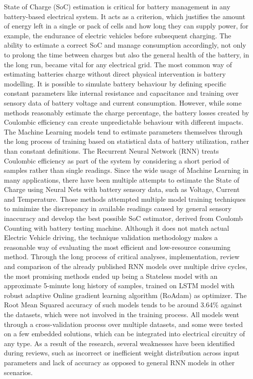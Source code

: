 %
%
{
State of Charge (SoC) estimation is critical for battery management in any battery-based electrical system.
It acts as a criterion, which justifies the amount of energy left in a single or pack of cells and how long they can supply power, for example, the endurance of electric vehicles before subsequent charging.
The ability to estimate a correct SoC and manage consumption accordingly, not only to prolong the time between charges but also the general health of the battery, in the long run, became vital for any electrical grid.
The most common way of estimating batteries charge without direct physical intervention is battery modelling.
It is possible to simulate battery behaviour by defining specific constant parameters like internal resistance and capacitance and training over sensory data of battery voltage and current consumption.
However, while some methods reasonably estimate the charge percentage, the battery losses created by Coulombic efficiency can create unpredictable behaviour with different impacts.
The Machine Learning models tend to estimate parameters themselves through the long process of training based on statistical data of battery utilization, rather than constant definitions.
The Recurrent Neural Network (RNN) treats Coulombic efficiency as part of the system by considering a short period of samples rather than single readings.
Since the wide usage of Machine Learning in many applications, there have been multiple attempts to estimate the State of Charge using Neural Nets with battery sensory data, such as Voltage, Current and Temperature.
Those methods attempted multiple model training techniques to minimize the discrepancy in available readings caused by general sensory inaccuracy and develop the best possible SoC estimator, derived from Coulomb Counting with battery testing machine.
Although it does not match actual Electric Vehicle driving, the technique validation methodology makes a reasonable way of evaluating the most efficient and low-resource consuming method.
Through the long process of critical analyses, implementation, review and comparison of the already published RNN models over multiple drive cycles, the most promising methods ended up being a Stateless model with an approximate 5-minute long history of samples, trained on LSTM model with robust adaptive Online gradient learning algorithm (RoAdam) as optimizer.
The Root Mean Squared accuracy of such models tends to be around 3.64\% against the datasets, which were not involved in the training process.
All models went through a cross-validation process over multiple datasets, and some were tested on a few embedded solutions, which can be integrated into electrical circuitry of any type.
As a result of the research, several weaknesses have been identified during reviews, such as incorrect or inefficient weight distribution across input parameters and lack of accuracy as opposed to general RNN models in other scenarios.
}
